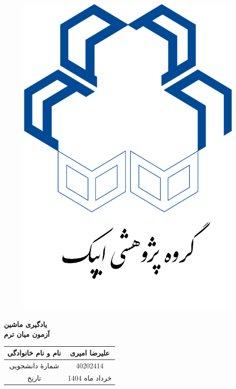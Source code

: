 \begin{titlepage}
\begin{center}

  \begin{figure}[h!]
 	\centering
 	\subfigure
 	{
 		\includegraphics[width=0.33\columnwidth, height=0.45\columnwidth]{Fault}
 		\label{fig:FD3Msav43i22ngCdW2}
 	}
 \end{figure}
 
 
\vfill
        
\Huge
\textbf{یادگیری ماشین}\\
\textbf{آزمون میان ترم}\\
        
\vfill
        
\begin{table}[ht]
    \centering
    \huge
    \begin{tabular}{|c|c|}
    \hline
    نام و نام خانوادگی & علیرضا امیری\\
    \hline
    شمارۀ دانشجویی &  40202414\\
    \hline
    تاریخ & خرداد ماه 1404\\
    \hline
    \end{tabular}
\end{table}
\end{center}
\end{titlepage}
